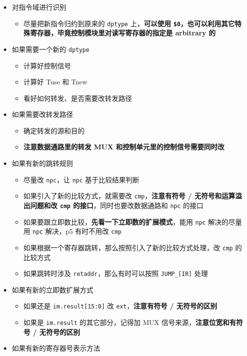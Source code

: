 \documentclass[12pt,AutoFakeBold,AutoFakeSlant]{article}
\providecommand{\tightlist}{%
  \setlength{\itemsep}{0pt}\setlength{\parskip}{0pt}}
\begin{document}
\begin{itemize}
\tightlist
\item
  对指令域进行识别

  \begin{itemize}
  \tightlist
  \item
    尽量把新指令归约到原来的 \texttt{dptype} 上，\textbf{可以使用
    \texttt{\$0}，也可以利用其它特殊寄存器，毕竟控制模块里对读写寄存器的指定是
    arbitrary 的}
  \end{itemize}
\item
  如果需要一个新的 \texttt{dptype}

  \begin{itemize}
  \tightlist
  \item
    计算好控制信号
  \item
    计算好 Tuse 和 Tnew
  \item
    看好如何转发、是否需要改转发路径
  \end{itemize}
\item
  如果需要改转发路径

  \begin{itemize}
  \tightlist
  \item
    确定转发的源和目的
  \item
    \textbf{注意数据通路里的转发 MUX 和控制单元里的控制信号需要同时改}
  \end{itemize}
\item
  如果有新的跳转规则

  \begin{itemize}
  \tightlist
  \item
    尽量改 \texttt{npc}，让 \texttt{npc} 基于比较结果判断
  \item
    如果引入了新的比较方式，就需要改 \texttt{cmp}，\textbf{注意有符号 /
    无符号和运算溢出问题和改 \texttt{cmp} 的接口}，同时也要改数据通路和
    \texttt{npc} 的接口
  \item
    如果要跟立即数比较，\textbf{先看一下立即数的扩展模式}，能用
    \texttt{npc} 解决的尽量用 \texttt{npc} 解决，p5 有时不用改
    \texttt{cmp}
  \item
    如果根据一个寄存器跳转，那么按照引入了新的比较方式处理，改
    \texttt{cmp} 的比较方式
  \item
    如果跳转时涉及 \texttt{retaddr}，那么有时可以按照
    \texttt{JUMP\_{[}IR{]}} 处理
  \end{itemize}
\item
  如果有新的立即数扩展方式

  \begin{itemize}
  \tightlist
  \item
    如果还是 \texttt{im.result{[}15:0{]}} 改
    \texttt{ext}，\textbf{注意有符号 / 无符号的区别}
  \item
    如果是 \texttt{im.result} 的其它部分，记得加 MUX
    信号来源，\textbf{注意位宽和有符号 / 无符号的区别}
  \end{itemize}
\item
  如果有新的寄存器号表示方法


\end{itemize}
\end{document}
